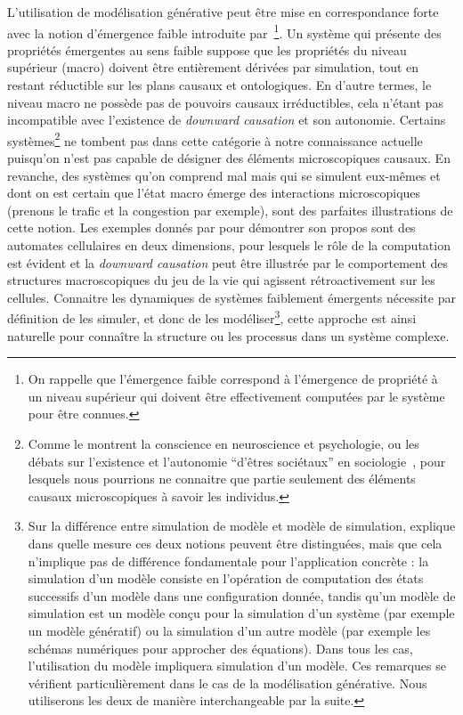 {}{
L'utilisation de modélisation générative peut être mise en correspondance forte avec la notion d'émergence faible introduite par~\cite{bedau2002downward}\footnote{On rappelle que l'émergence faible correspond à l'émergence de propriété à un niveau supérieur qui doivent être effectivement computées par le système pour être connues.}. Un système qui présente des propriétés émergentes au sens faible suppose que les propriétés du niveau supérieur (macro) doivent être entièrement dérivées par simulation, tout en restant réductible sur les plans causaux et ontologiques. En d'autre termes, le niveau macro ne possède pas de pouvoirs causaux irréductibles, cela n'étant pas incompatible avec l'existence de \emph{downward causation} et son autonomie. Certains systèmes\footnote{Comme le montrent la conscience en neuroscience et psychologie, ou les débats sur l'existence et l'autonomie ``d'êtres sociétaux'' en sociologie~\cite{angeletti2015etres}, pour lesquels nous pourrions ne connaitre que partie seulement des éléments causaux microscopiques à savoir les individus.} ne tombent pas dans cette catégorie à notre connaissance actuelle puisqu'on n'est pas capable de désigner des éléments microscopiques causaux. En revanche, des systèmes qu'on comprend mal mais qui se simulent eux-mêmes et dont on est certain que l'état macro émerge des interactions microscopiques (prenons le trafic et la congestion par exemple), sont des parfaites illustrations de cette notion. Les exemples donnés par  pour démontrer son propos sont des automates cellulaires en deux dimensions, pour lesquels le rôle de la computation est évident et la \emph{downward causation} peut être illustrée par le comportement des structures macroscopiques du jeu de la vie qui agissent rétroactivement sur les cellules. Connaitre les dynamiques de systèmes faiblement émergents nécessite par définition de les simuler, et donc de les modéliser\footnote{Sur la différence entre simulation de modèle et modèle de simulation, \cite{phan2010agent} explique dans quelle mesure ces deux notions peuvent être distinguées, mais que cela n'implique pas de différence fondamentale pour l'application concrète : la simulation d'un modèle consiste en l'opération de computation des états successifs d'un modèle dans une configuration donnée, tandis qu'un modèle de simulation est un modèle conçu pour la simulation d'un système (par exemple un modèle génératif) ou la simulation d'un autre modèle (par exemple les schémas numériques pour approcher des équations). Dans tous les cas, l'utilisation du modèle impliquera simulation d'un modèle. Ces remarques se vérifient particulièrement dans le cas de la modélisation générative. Nous utiliserons les deux de manière interchangeable par la suite.}, cette approche est ainsi naturelle pour connaître la structure ou les processus dans un système complexe.
}



